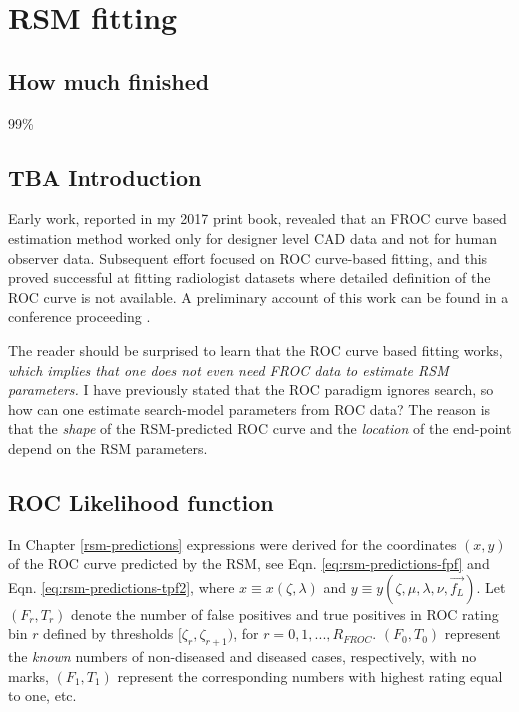 \documentclass[
]{book}
\begin{document}
\hypertarget{rsm-fitting}{%
\chapter{RSM fitting}\label{rsm-fitting}}

\hypertarget{rsm-fitting-how-much-finished}{%
\section{How much finished}\label{rsm-fitting-how-much-finished}}

99\%

\hypertarget{rsm-fitting-intro}{%
\section{TBA Introduction}\label{rsm-fitting-intro}}

Early work, reported in my 2017 print book, revealed that an FROC curve based estimation method worked only for designer level CAD data and not for human observer data. Subsequent effort focused on ROC curve-based fitting, and this proved successful at fitting radiologist datasets where detailed definition of the ROC curve is not available. A preliminary account of this work can be found in a conference proceeding \citep{chakraborty2011estimating}.

The reader should be surprised to learn that the ROC curve based fitting works, \emph{which implies that one does not even need FROC data to estimate RSM parameters.} I have previously stated that the ROC paradigm ignores search, so how can one estimate search-model parameters from ROC data? The reason is that the \emph{shape} of the RSM-predicted ROC curve and the \emph{location} of the end-point depend on the RSM parameters.

\hypertarget{rsm-fitting-roc-likelihood}{%
\section{ROC Likelihood function}\label{rsm-fitting-roc-likelihood}}

In Chapter \ref{rsm-predictions} expressions were derived for the coordinates \((x,y)\) of the ROC curve predicted by the RSM, see Eqn. \eqref{eq:rsm-predictions-fpf} and Eqn. \eqref{eq:rsm-predictions-tpf2}, where \(x\equiv x(\zeta,\lambda)\) and \(y \equiv y(\zeta , \mu, \lambda, \nu, \overrightarrow{f_L})\). Let \((F_r,T_r)\) denote the number of false positives and true positives in ROC rating bin \(r\) defined by thresholds \([\zeta_r, \zeta_{r+1})\), for \(r = 0, 1, ..., R_{FROC}\). \((F_0,T_0)\) represent the \emph{known} numbers of non-diseased and diseased cases, respectively, with no marks, \((F_1,T_1)\) represent the corresponding numbers with highest rating equal to one, etc.
\end{document}
